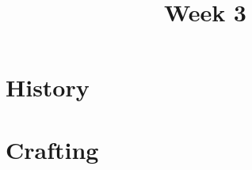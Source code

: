 \documentclass[11pt]{article}
\title{Week 3}
\date{}
\begin{document}
    \maketitle

    \section*{History}
        \begin{itemize}
        \end{itemize}

    \section*{Crafting}
        \begin{itemize}
        \end{itemize}
\end{document}
